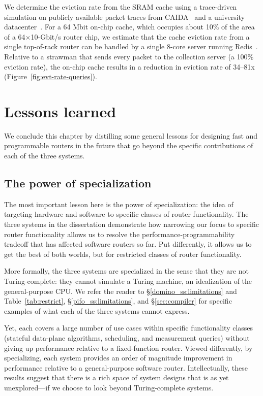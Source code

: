  We determine the eviction rate from the SRAM cache using a trace-driven
simulation on publicly available packet traces from CAIDA~\cite{caida2016,
caida2014} and a university datacenter~\cite{theo_dc}. For a 64 Mbit on-chip
cache, which occupies about 10\% of the area of a 64$\times$10-Gbit/s router chip, we
estimate that the cache eviction rate from a single top-of-rack router can be
handled by a single 8-core server running Redis~\cite{redis}. Relative to a
strawman that sends every packet to the collection server (\ie a 100\% eviction
rate), the on-chip cache results in a reduction in eviction rate of 34--81x
(Figure~\ref{fig:evt-rate-queries}).

\section{Lessons learned} We conclude this chapter by distilling some general
lessons for designing fast and programmable routers in the future that go
beyond the specific contributions of each of the three systems.

\subsection{The power of specialization} The most important lesson here is the
power of specialization: the idea of targeting hardware and software to
specific classes of router functionality.  The three systems in the
dissertation demonstrate how narrowing our focus to specific router
functionality allows us to resolve the performance-programmability tradeoff
that has affected software routers so far. Put differently, it allows us to get
the best of both worlds, but for restricted classes of router functionality.

More formally, the three systems are specialized in the sense that they are not
Turing-complete: they cannot simulate a Turing machine, an idealization of the
general-purpose CPU.  We refer the reader to \S\ref{domino_ss:limitations} and
Table~\ref{tab:restrict}, \S\ref{pifo_ss:limitations}, and \S\ref{sec:compiler}
for specific examples of what each of the three systems cannot express.

Yet, each covers a large number of use cases within specific functionality
classes (stateful data-plane algorithms, scheduling, and measurement queries)
without giving up performance relative to a fixed-function router. Viewed
differently, by specializing, each system provides an order of magnitude
improvement in performance relative to a general-purpose software router.
Intellectually, these results suggest that there is a rich space of system
designs that is as yet unexplored---if we choose to look beyond Turing-complete
systems. 

